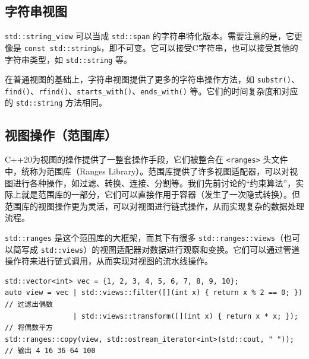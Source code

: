 \subsection{字符串视图}

\verb|std::string_view| 可以当成 \verb|std::span| 的字符串特化版本。需要注意的是，它更像是 \verb|const std::string&|，即不可变。它可以接受C字符串，也可以接受其他的字符串类型，如 \verb|std::string| 等。

在普通视图的基础上，字符串视图提供了更多的字符串操作方法，如 \verb|substr()|、\verb|find()|、\verb|rfind()|、\verb|starts_with()|、\verb|ends_with()| 等。它们的时间复杂度和对应的 \verb|std::string| 方法相同。

\subsection{视图操作（范围库）}

C++20为视图的操作提供了一整套操作手段，它们被整合在 \verb|<ranges>| 头文件中，统称为范围库（Ranges Library）。范围库提供了许多视图适配器，可以对视图进行各种操作，如过滤、转换、连接、分割等。我们先前讨论的“约束算法”，实际上就是范围库的一部分，它们可以直接作用于容器（发生了一次隐式转换）。但范围库的视图操作更为灵活，可以对视图进行链式操作，从而实现复杂的数据处理流程。

\verb|std::ranges| 是这个范围库的大框架，而其下有很多 \verb|std::ranges::views|（也可以简写成 \verb|std::views|）的视图适配器对数据进行观察和变换。它们可以通过管道操作符来进行链式调用，从而实现对视图的流水线操作。

\begin{verbatim}
std::vector<int> vec = {1, 2, 3, 4, 5, 6, 7, 8, 9, 10};
auto view = vec | std::views::filter([](int x) { return x % 2 == 0; }) // 过滤出偶数
                | std::views::transform([](int x) { return x * x; }); // 将偶数平方
std::ranges::copy(view, std::ostream_iterator<int>(std::cout, " ")); // 输出 4 16 36 64 100
\end{verbatim}